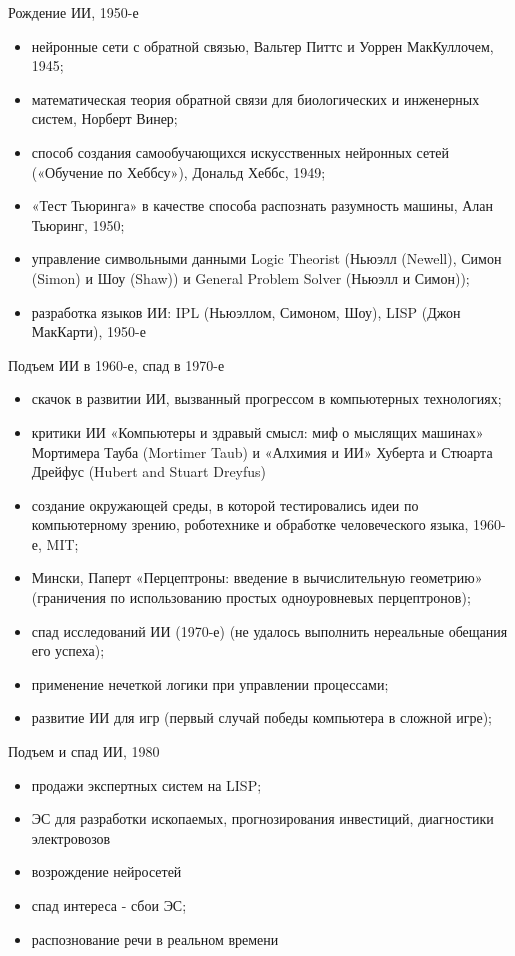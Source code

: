 \documentclass{beamer}
\begin{document}
\begin{frame}[t]
Рождение ИИ, 1950-е
\begin{itemize}
\item нейронные сети с обратной связью, Вальтер Питтс и Уоррен МакКуллочем, 1945;
\item математическая теория обратной связи для биологических и инженерных систем, Норберт Винер;
\item способ создания самообучающихся искусственных нейронных сетей («Обучение по Хеббсу»), Дональд Хеббс, 1949; 
\item «Тест Тьюринга» в качестве способа распознать разумность машины, Алан Тьюринг, 1950;
\item управление символьными данными Logic Theorist (Ньюэлл (Newell), Симон (Simon) и Шоу (Shaw)) и General Problem Solver (Ньюэлл и Симон));
\item разработка языков ИИ: IPL (Ньюэллом, Симоном, Шоу), LISP (Джон МакКарти), 1950-е
\end{itemize}
\end{frame}

\begin{frame}[t]
Подъем ИИ в 1960-е, спад в 1970-е
\begin{itemize}
\item скачок в развитии ИИ, вызванный прогрессом в компьютерных технологиях;
\item критики ИИ «Компьютеры и здравый смысл: миф о мыслящих машинах» Мортимера
Тауба (Mortimer Taub) и «Алхимия и ИИ» Хуберта и Стюарта Дрейфус (Hubert and Stuart Dreyfus)
\item создание окружающей среды, в которой тестировались идеи по компьютерному зрению, роботехнике и обработке человеческого языка, 1960-е, MIT;
\item Мински, Паперт «Перцептроны: введение в вычислительную геометрию» (граничения по использованию простых одноуровневых перцептронов);
\item спад исследований ИИ (1970-е) (не удалось выполнить нереальные обещания его успеха);
\item применение нечеткой логики при управлении процессами;
\item развитие ИИ для игр (первый случай победы компьютера в сложной игре);
\end{itemize}
\end{frame}

\begin{frame}[t]
Подъем и спад ИИ, 1980
\begin{itemize}
\item продажи экспертных систем на LISP;
\item ЭС для разработки ископаемых, прогнозирования инвестиций, диагностики электровозов
\item возрождение нейросетей
\item спад интереса - сбои ЭС;
\item распознование речи в реальном времени
\end{itemize}
\end{frame}
\end{document}
